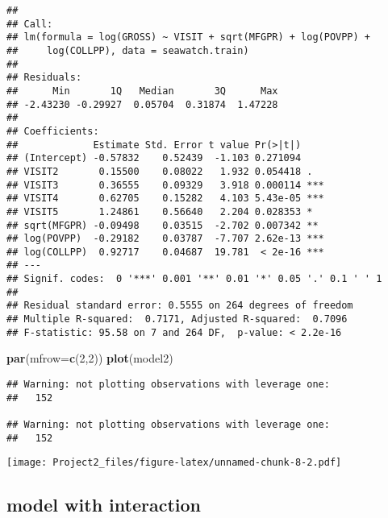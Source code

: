 \documentclass[]{article}
\newenvironment{Shaded}{\begin{snugshade}}{\end{snugshade}}
\newcommand{\KeywordTok}[1]{\textcolor[rgb]{0.13,0.29,0.53}{\textbf{#1}}}
\newcommand{\DataTypeTok}[1]{\textcolor[rgb]{0.13,0.29,0.53}{#1}}
\newcommand{\DecValTok}[1]{\textcolor[rgb]{0.00,0.00,0.81}{#1}}
\newcommand{\CommentTok}[1]{\textcolor[rgb]{0.56,0.35,0.01}{\textit{#1}}}
\newcommand{\OperatorTok}[1]{\textcolor[rgb]{0.81,0.36,0.00}{\textbf{#1}}}
\newcommand{\NormalTok}[1]{#1}
\begin{document}
\begin{verbatim}
## 
## Call:
## lm(formula = log(GROSS) ~ VISIT + sqrt(MFGPR) + log(POVPP) + 
##     log(COLLPP), data = seawatch.train)
## 
## Residuals:
##      Min       1Q   Median       3Q      Max 
## -2.43230 -0.29927  0.05704  0.31874  1.47228 
## 
## Coefficients:
##             Estimate Std. Error t value Pr(>|t|)    
## (Intercept) -0.57832    0.52439  -1.103 0.271094    
## VISIT2       0.15500    0.08022   1.932 0.054418 .  
## VISIT3       0.36555    0.09329   3.918 0.000114 ***
## VISIT4       0.62705    0.15282   4.103 5.43e-05 ***
## VISIT5       1.24861    0.56640   2.204 0.028353 *  
## sqrt(MFGPR) -0.09498    0.03515  -2.702 0.007342 ** 
## log(POVPP)  -0.29182    0.03787  -7.707 2.62e-13 ***
## log(COLLPP)  0.92717    0.04687  19.781  < 2e-16 ***
## ---
## Signif. codes:  0 '***' 0.001 '**' 0.01 '*' 0.05 '.' 0.1 ' ' 1
## 
## Residual standard error: 0.5555 on 264 degrees of freedom
## Multiple R-squared:  0.7171, Adjusted R-squared:  0.7096 
## F-statistic: 95.58 on 7 and 264 DF,  p-value: < 2.2e-16
\end{verbatim}

\begin{Shaded}
\begin{Highlighting}[]
\KeywordTok{par}\NormalTok{(}\DataTypeTok{mfrow=}\KeywordTok{c}\NormalTok{(}\DecValTok{2}\NormalTok{,}\DecValTok{2}\NormalTok{))}
\KeywordTok{plot}\NormalTok{(model2)}
\end{Highlighting}
\end{Shaded}

\begin{verbatim}
## Warning: not plotting observations with leverage one:
##   152

## Warning: not plotting observations with leverage one:
##   152
\end{verbatim}

\texttt{[image: Project2\_files/figure-latex/unnamed-chunk-8-2.pdf]}

\subsection{model with interaction}\label{model-with-interaction}

\begin{Shaded}
\end{Shaded}
\end{document}
